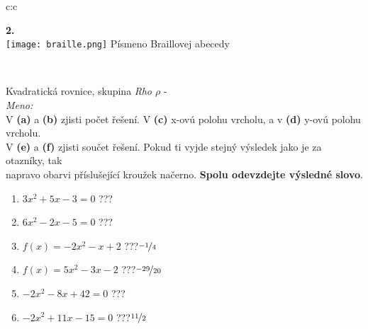 \documentclass[10pt]{report}
\begin{document}
\begin{tabular}{c:c}
\begin{minipage}[c][99mm][t]{0.49\linewidth}
\begin{center}
\begin{minipage}{0.20\linewidth}
\begin{center}
{\Huge\bfseries 2.} \\[2mm]
\texttt{[image: braille.png]}
{\small Písmeno Braillovej abecedy}
\end{center}
\end{minipage}
\end{center}
\end{minipage}
\\ \hdashline
\begin{minipage}[c][99mm][t]{0.49\linewidth}
\begin{center}
\vspace{7mm}
{\huge Kvadratická rovnice, skupina \textit{Rho $\rho$} -}\\[4.5mm]
\textit{Meno:}\phantom{xxxxxxxxxxxxxxxxxxxxxxxxxxxxxxxxxxxxxxxxxxxxxxxxxxxxxxxxxxxxxxxxx}\\[3.5mm]
V \textbf{(a)} a \textbf{(b)} zjisti počet řešení. V \textbf{(c)} x-ovú polohu vrcholu, a v \textbf{(d)} y-ovú polohu vrcholu.\\V \textbf{(e)} a \textbf{(f)} zjisti součet řešení. Pokud ti vyjde stejný výsledek jako je za otazníky, tak\\napravo obarvi příslušející kroužek načerno. \textbf{Spolu odevzdejte výsledné slovo}.\\[3mm]
\begin{minipage}{0.77\linewidth}
\begin{center}
\begin{varwidth}{\textwidth}
\begin{enumerate}
\large
\item $3x^2+5x-3=0$\quad \dotfill\; ???\;\dotfill {}
\item $6x^2-2x-5=0$\quad \dotfill\; ???\;\dotfill {}
\item $f(x)=-2x^2-x+2$\quad \dotfill\; ???\;\dotfill \quad $\nicefrac{-1}{4}$
\item $f(x)=5x^2-3x-2$\quad \dotfill\; ???\;\dotfill \quad $\nicefrac{-29}{20}$
\item $-2x^2-8x+42=0$\quad \dotfill\; ???\;\dotfill {}
\item $-2x^2+11x-15=0$\quad \dotfill\; ???\;\dotfill \quad $\nicefrac{11}{2}$
\end{enumerate}
\end{varwidth}
\end{center}
\end{minipage}
\begin{minipage}{0.20\linewidth}
\begin{center}

\end{center}
\end{minipage}
\end{center}
\end{minipage}
\end{tabular}
\end{document}
